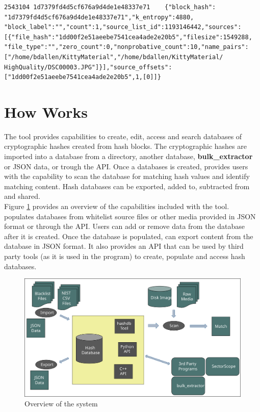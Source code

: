 \documentclass[11pt,fleqn]{article} %
\begin{document}
\begin{enumerate}
\begingroup
\footnotesize
\begin{Verbatim}[fontfamily=courier]
2543104	1d7379fd4d5cf676a9d4de1e48337e71	{"block_hash":
"1d7379fd4d5cf676a9d4de1e48337e71","k_entropy":4880,
"block_label":"","count":1,"source_list_id":1193146442,"sources":
[{"file_hash":"1dd00f2e51aeebe7541cea4ade2e20b5","filesize":1549288,
"file_type":"","zero_count":0,"nonprobative_count":10,"name_pairs":
["/home/bdallen/KittyMaterial","/home/bdallen/KittyMaterial/
HighQuality/DSC00003.JPG"]}],"source_offsets":
["1dd00f2e51aeebe7541cea4ade2e20b5",1,[0]]}
\end{Verbatim}
\endgroup

\end{enumerate}

\section{How \hdb Works}
The \hdb tool provides capabilities to create, edit, access and search databases of cryptographic hashes created from hash blocks. The cryptographic hashes are imported into a database from a directory, another database, \textbf{bulk\_extractor} or JSON data, or trough the \hdb API.
Once a databases is created, \hdb provides users with the capability to scan the database for matching hash values and identify matching content. Hash databases can be exported, added to, subtracted from and shared.\\


Figure \ref{fig:overviewFigure} provides an overview of the capabilities included with the \hdb tool. \hdb populates databases from whitelist source files
or other media provided in JSON format or through the API.
Users can add or remove data from the database after it is created.
Once the database is populated, \hdb can export content from the database in JSON format. It also provides an API that can be used by third party tools (as it is used in the \bulk program) to create, populate and access hash databases.\\

\begin{figure}
	\center
	\includegraphics[scale=.45]{drawings/hashdb_system_overview}
	\caption{Overview of the \hdb system}
	\label{fig:overviewFigure}
\end{figure}
\end{document}
